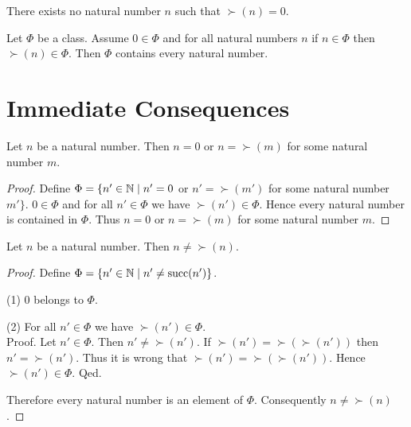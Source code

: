 \documentclass[10pt]{article}
\begin{document}
  \begin{forthel}
    \begin{axiom}
      There exists no natural number $n$ such that $\succ(n) = 0$.
    \end{axiom}
  \end{forthel}

  \begin{forthel}
    \begin{axiom}
      Let $\Phi$ be a class.
      Assume $0 \in \Phi$ and for all natural numbers $n$ if $n \in \Phi$ then
      $\succ(n) \in \Phi$.
      Then $\Phi$ contains every natural number.
    \end{axiom}
  \end{forthel}


  \section{Immediate Consequences}

  \begin{forthel}
    \begin{proposition}
      Let $n$ be a natural number.
      Then $n = 0$ or $n = \succ(m)$ for some natural number $m$.
    \end{proposition}
    \begin{proof}
      Define $\Phi = \{ n' \in \mathbb{N} \mid n' = 0$ or $n' = \succ(m')$ for some
      natural number $m' \}$.
      $0 \in \Phi$ and for all $n' \in  \Phi$ we have $\succ(n') \in \Phi$.
      Hence every natural number is contained in $\Phi$.
      Thus $n = 0$ or $n = \succ(m)$ for some natural number $m$.
    \end{proof}
  \end{forthel}

  \begin{forthel}
    \begin{proposition}
      Let $n$ be a natural number.
      Then $n \neq \succ(n)$.
    \end{proposition}
    \begin{proof}
      Define $\Phi = \{ n' \in \mathbb{N} \mid n' \neq \textrm{succ}(n') \}$.

      (1) $0$ belongs to $\Phi$.

      (2) For all $n' \in \Phi$ we have $\succ(n') \in \Phi$. \\
      Proof.
        Let $n' \in \Phi$.
        Then $n' \neq \succ(n')$.
        If $\succ(n') = \succ(\succ(n'))$ then $n' = \succ(n')$.
        Thus it is wrong that $\succ(n') = \succ(\succ(n'))$.
        Hence $\succ(n') \in \Phi$.
      Qed.

      Therefore every natural number is an element of $\Phi$.
      Consequently $n \neq \succ(n)$.
    \end{proof}
  \end{forthel}
\end{document}
